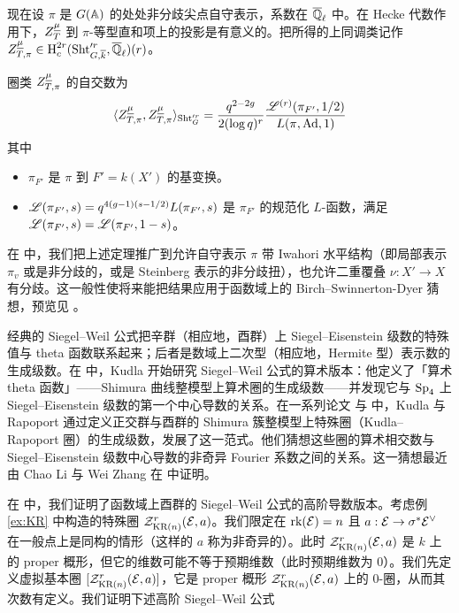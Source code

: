 现在设 $\pi$ 是 $G(\AA)$ 的处处非分歧尖点自守表示，系数在 $\Qlbar$ 中。在 Hecke 代数作用下，$Z^{\un\mu}_{T}$ 到 $\pi$-等型直和项上的投影是有意义的。把所得的上同调类记作 $Z^{\un\mu}_{T,\pi}\in \cohoc{2r}{\Sht'^{r}_{G,\kbar},\Qlbar}(r)$。

\begin{thm}[\cite{YZ1}]\label{th:YZ1} 圈类 $Z^{\un\mu}_{T,\pi}$ 的自交数为
\begin{equation*}
\j{Z^{\un\mu}_{T,\pi}, Z^{\un\mu}_{T,\pi}}_{\Sht'^{r}_{G}}=\frac{q^{2-2g}}{2(\log q)^{r}}\frac{\sL^{(r)}(\pi_{F'}, 1/2)}{L(\pi,\Ad,1)}
\end{equation*}
其中
\begin{itemize}
\item $\pi_{F'}$ 是 $\pi$ 到 $F'=k(X')$ 的基变换。
\item $\sL(\pi_{F'},s)=q^{4(g-1)(s-1/2)}L(\pi_{F'},s)$ 是 $\pi_{F'}$ 的规范化 $L$-函数，满足 $\sL(\pi_{F'},s)=\sL(\pi_{F'},1-s)$。
\end{itemize}
\end{thm}

在 \cite{YZ2} 中，我们把上述定理推广到允许自守表示 $\pi$ 带 Iwahori 水平结构（即局部表示 $\pi_{v}$ 或是非分歧的，或是 Steinberg 表示的非分歧扭），也允许二重覆叠 $\nu:X'\to X$ 有分歧。这一般性使将来能把结果应用于函数域上的 Birch–Swinnerton-Dyer 猜想，预览见 \cite[\S1.3]{YZ2}。

经典的 Siegel–Weil 公式把辛群（相应地，酉群）上 Siegel–Eisenstein 级数的特殊值与 theta 函数联系起来；后者是数域上二次型（相应地，Hermite 型）表示数的生成级数。在 \cite{Kud} 中，Kudla 开始研究 Siegel–Weil 公式的算术版本：他定义了「算术 theta 函数」——Shimura 曲线整模型上算术圈的生成级数——并发现它与 $\Sp_{4}$ 上 Siegel–Eisenstein 级数的第一个中心导数的关系。在一系列论文 \cite{KR1} 与 \cite{KR2} 中，Kudla 与 Rapoport 通过定义正交群与酉群的 Shimura 簇整模型上特殊圈（Kudla–Rapoport 圈）的生成级数，发展了这一范式。他们猜想这些圈的算术相交数与 Siegel–Eisenstein 级数中心导数的非奇异 Fourier 系数之间的关系。这一猜想最近由 Chao Li 与 Wei Zhang 在 \cite{LZ} 中证明。

在 \cite{FYZ1} 中，我们证明了函数域上酉群的 Siegel–Weil 公式的高阶导数版本。考虑例 \ref{ex:KR} 中构造的特殊圈 $\cZ^{r}_{\KR(n)}(\cE,a)$。我们限定在 $\rk (\cE)=n$ 且 $a: \cE\to\s^{*}\cE^{\vee}$ 在一般点上是同构的情形（这样的 $a$ 称为非奇异的）。此时 $\cZ^{r}_{\KR(n)}(\cE,a)$ 是 $k$ 上的 proper 概形，但它的维数可能不等于预期维数（此时预期维数为 $0$）。我们先定义虚拟基本圈 $[\cZ^{r}_{\KR(n)}(\cE,a)]$，它是 proper 概形 $\cZ^{r}_{\KR(n)}(\cE,a)$ 上的 $0$-圈，从而其次数有定义。我们证明下述高阶 Siegel–Weil 公式

